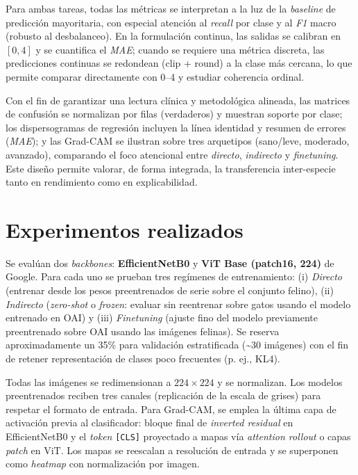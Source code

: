 \documentclass[11pt,spanish,listoffigures,listoftables]{tfgetsinf}
\begin{document}
Para ambas tareas, todas las métricas se interpretan a la luz de la \emph{baseline} de predicción mayoritaria, con especial atención al \emph{recall} por clase y al \emph{F1} macro (robusto al desbalanceo). En la formulación continua, las salidas se calibran en $[0,4]$ y se cuantifica el \emph{MAE}; cuando se requiere una métrica discreta, las predicciones continuas se redondean (clip + round) a la clase más cercana, lo que permite comparar directamente con 0--4 y estudiar coherencia ordinal.

Con el fin de garantizar una lectura clínica y metodológica alineada, las matrices de confusión se normalizan por filas (verdaderos) y muestran soporte por clase; los dispersogramas de regresión incluyen la línea identidad y resumen de errores (\emph{MAE}); y las Grad-CAM se ilustran sobre tres arquetipos (sano/leve, moderado, avanzado), comparando el foco atencional entre \emph{directo}, \emph{indirecto} y \emph{finetuning}. Este diseño permite valorar, de forma integrada, la transferencia inter-especie tanto en rendimiento como en explicabilidad.

\section{Experimentos realizados}

Se evalúan dos \emph{backbones}: \textbf{EfficientNetB0} y \textbf{ViT Base (patch16, 224)} de Google. Para cada uno se prueban tres regímenes de entrenamiento: (i) \emph{Directo} (entrenar desde los pesos preentrenados de serie sobre el conjunto felino), (ii) \emph{Indirecto} (\emph{zero-shot} o \emph{frozen}: evaluar sin reentrenar sobre gatos usando el modelo entrenado en OAI) y (iii) \emph{Finetuning} (ajuste fino del modelo previamente preentrenado sobre OAI usando las imágenes felinas). Se reserva aproximadamente un 35\% para validación estratificada (\textasciitilde30 imágenes) con el fin de retener representación de clases poco frecuentes (p. ej., \mbox{KL4}).

Todas las imágenes se redimensionan a $224\times224$ y se normalizan. Los modelos preentrenados reciben tres canales (replicación de la escala de grises) para respetar el formato de entrada. Para Grad-CAM, se emplea la última capa de activación previa al clasificador: bloque final de \emph{inverted residual} en EfficientNetB0 y el \emph{token} \texttt{[CLS]} proyectado a mapas vía \emph{attention rollout} o capas \emph{patch} en ViT. Los mapas se reescalan a resolución de entrada y se superponen como \emph{heatmap} con normalización por imagen.
\end{document}
